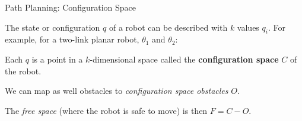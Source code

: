 \documentclass[compress,xcolor=table]{beamer}
\begin{document}

\begin{frame}{Path Planning: Configuration Space}

     The state or configuration $q$ of a robot can be described with $k$ values $q_i$.
        For example, for a two-link planar robot, $\theta_1$ and $\theta_2$:

        \begin{center}
        \end{center}

    Each $q$ is a point in a $k$-dimensional space called the
    \textbf{configuration space} $C$ of the robot.

    We can map as well obstacles to \emph{configuration space obstacles} $O$.

    The \emph{free space} (where the robot is safe to move) is then $F = C - O$.

\end{frame}
\end{document}
